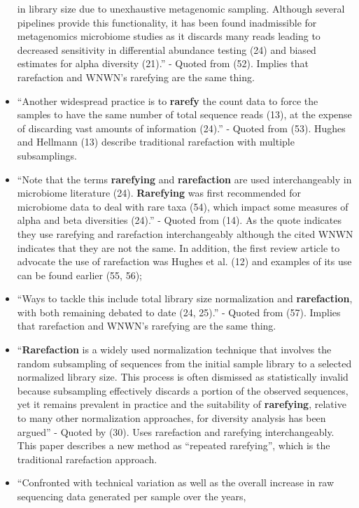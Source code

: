 \documentclass[
]{article}
\begin{document}
\begin{itemize}
  in library size due to unexhaustive metagenomic sampling. Although
  several pipelines provide this functionality, it has been found
  inadmissible for metagenomics microbiome studies as it discards many
  reads leading to decreased sensitivity in differential abundance
  testing (24) and biased estimates for alpha diversity (21).'' - Quoted
  from (52). Implies that rarefaction and WNWN's rarefying are the same
  thing.
\item
  ``Another widespread practice is to \textbf{rarefy} the count data to
  force the samples to have the same number of total sequence reads
  (13), at the expense of discarding vast amounts of information (24).''
  - Quoted from (53). Hughes and Hellmann (13) describe traditional
  rarefaction with multiple subsamplings.
\item
  ``Note that the terms \textbf{rarefying} and \textbf{rarefaction} are
  used interchangeably in microbiome literature (24). \textbf{Rarefying}
  was first recommended for microbiome data to deal with rare taxa (54),
  which impact some measures of alpha and beta diversities (24).'' -
  Quoted from (14). As the quote indicates they use rarefying and
  rarefaction interchangeably although the cited WNWN indicates that
  they are not the same. In addition, the first review article to
  advocate the use of rarefaction was Hughes et al. (12) and examples of
  its use can be found earlier (55, 56);
\item
  ``Ways to tackle this include total library size normalization and
  \textbf{rarefaction}, with both remaining debated to date (24, 25).''
  - Quoted from (57). Implies that rarefaction and WNWN's rarefying are
  the same thing.
\item
  ``\textbf{Rarefaction} is a widely used normalization technique that
  involves the random subsampling of sequences from the initial sample
  library to a selected normalized library size. This process is often
  dismissed as statistically invalid because subsampling effectively
  discards a portion of the observed sequences, yet it remains prevalent
  in practice and the suitability of \textbf{rarefying}, relative to
  many other normalization approaches, for diversity analysis has been
  argued'' - Quoted by (30). Uses rarefaction and rarefying
  interchangeably. This paper describes a new method as ``repeated
  rarefying'', which is the traditional rarefaction approach.
\item
  ``Confronted with technical variation as well as the overall increase
  in raw sequencing data generated per sample over the years,

\end{itemize}
\end{document}
